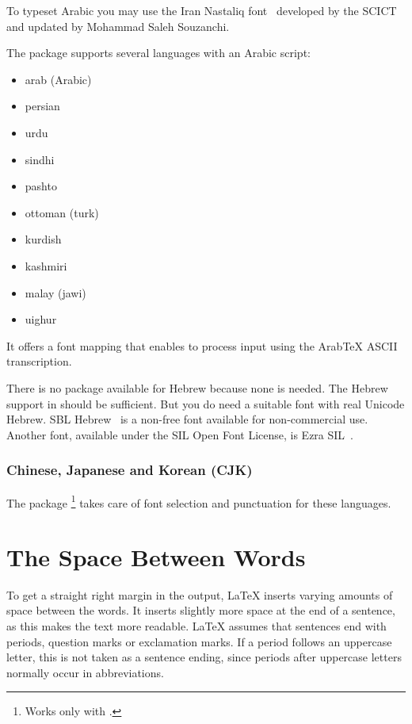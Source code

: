 To typeset Arabic you may use the Iran Nastaliq font~\cite{font:IranNastaliq}
developed by the SCICT and updated by Mohammad Saleh Souzanchi.

The  package supports several languages with
an Arabic script:
\begin{itemize}
  \item arab (Arabic)
  \item persian
  \item urdu
  \item sindhi
  \item pashto
  \item ottoman (turk)
  \item kurdish
  \item kashmiri
  \item malay (jawi)
  \item uighur
\end{itemize}

It offers a font mapping that enables  to process input
using the Arab\TeX{} ASCII transcription.

There is no package available for Hebrew because none is needed.
The Hebrew support in  should be sufficient. But you do need a
suitable font with real Unicode Hebrew. SBL Hebrew~\cite{font:sblhebrew} is a
non-free font available for non-commercial use. Another font, available under
the SIL Open Font License, is Ezra SIL~\cite{font:ezrasil}.

\subsubsection{Chinese, Japanese and Korean (CJK)}%

The package \footnote{Works only with
  .} takes care of font selection and
punctuation for these languages.

\section{The Space Between Words}

To get a straight right margin in the output, \LaTeX{} inserts varying
amounts of space between the words. It inserts slightly more space at
the end of a sentence, as this makes the text more readable.  \LaTeX{}
assumes that sentences end with periods, question marks or exclamation
marks. If a period follows an uppercase letter, this is not taken as a
sentence ending, since periods after uppercase letters normally occur in
abbreviations.

